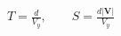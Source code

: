 \documentclass[border=2.5pt]{standalone}
\begin{document}
$\displaystyle T=\frac d{V_y},\qquad S=\frac{d|\bm V|}{V_y}$
\end{document}
